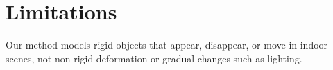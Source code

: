 \section{Limitations}
\label{sec:limitations}

Our method models rigid objects that appear, disappear, or move in indoor scenes, not non-rigid deformation or gradual
changes such as lighting.
